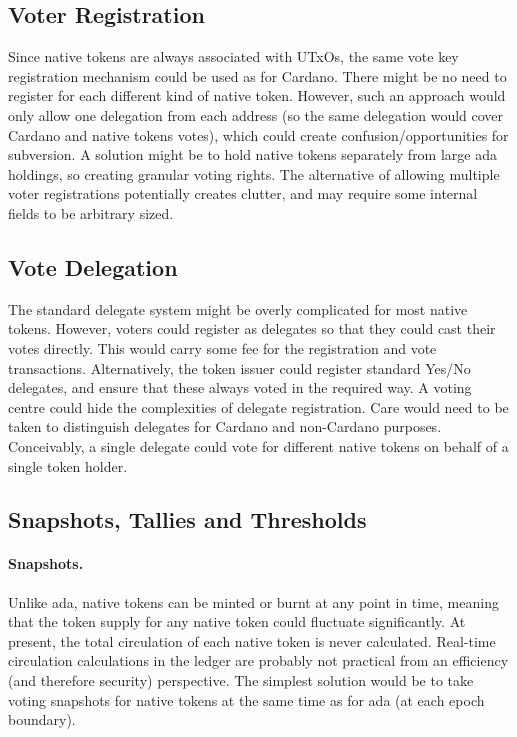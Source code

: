 \subsection{Voter Registration}

Since native tokens are always associated with UTxOs, the same vote key
registration mechanism could be used as for Cardano.  There might be no need to
register for each different kind of native token.  However, such an approach
would only allow one delegation from each address (so the same delegation would
cover Cardano and native tokens votes), which could create
confusion/opportunities for subversion.  A solution might be to hold native
tokens separately from large ada holdings, so creating granular voting rights.
The alternative of allowing multiple voter registrations potentially creates
clutter, and may require some internal fields to be arbitrary sized.

\subsection{Vote Delegation}

The standard delegate system might be overly complicated for most native tokens.
However, voters could register as delegates so that they could cast their votes
directly.  This would carry some fee for the registration and vote transactions.
Alternatively, the token issuer could register standard Yes/No delegates, and
ensure that these always voted in the required way.  A voting centre could hide
the complexities of delegate registration.  Care would need to be taken to
distinguish delegates for Cardano and non-Cardano purposes.  Conceivably, a
single delegate could vote for different native tokens on behalf of a single
token holder.

\subsection{Snapshots, Tallies and Thresholds}

\paragraph{Snapshots.}
Unlike ada, native tokens can be minted or burnt at any point in time, meaning
that the token supply for any native token could fluctuate significantly.  At
present, the total circulation of each native token is never calculated.
Real-time circulation calculations in the ledger are probably not practical from
an efficiency (and therefore security) perspective.  The simplest solution would
be to take voting snapshots for native tokens at the same time as for ada (at
each epoch boundary).

